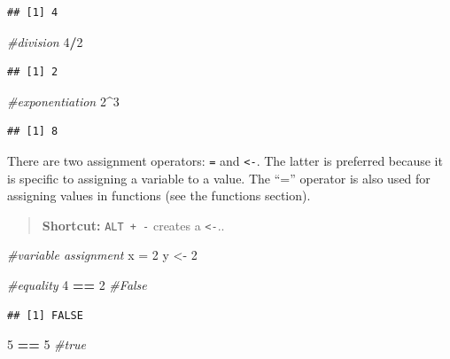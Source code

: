 \documentclass[openany]{book}
\newenvironment{Shaded}{\begin{snugshade}}{\end{snugshade}}
\newcommand{\CommentTok}[1]{\textcolor[rgb]{0.56,0.35,0.01}{\textit{#1}}}
\newcommand{\DecValTok}[1]{\textcolor[rgb]{0.00,0.00,0.81}{#1}}
\newcommand{\NormalTok}[1]{#1}
\newcommand{\OperatorTok}[1]{\textcolor[rgb]{0.81,0.36,0.00}{\textbf{#1}}}
\newcommand{\StringTok}[1]{\textcolor[rgb]{0.31,0.60,0.02}{#1}}
\begin{document}
\begin{verbatim}
## [1] 4
\end{verbatim}

\begin{Shaded}
\begin{Highlighting}[]
\CommentTok{#division}
\DecValTok{4}\OperatorTok{/}\DecValTok{2}
\end{Highlighting}
\end{Shaded}

\begin{verbatim}
## [1] 2
\end{verbatim}

\begin{Shaded}
\begin{Highlighting}[]
\CommentTok{#exponentiation}
\DecValTok{2}\OperatorTok{^}\DecValTok{3}
\end{Highlighting}
\end{Shaded}

\begin{verbatim}
## [1] 8
\end{verbatim}

There are two assignment operators: \texttt{=} and \texttt{\textless{}-}. The latter is preferred because it is specific to assigning a variable to a value. The ``='' operator is also used for assigning values in functions (see the functions section).

\begin{quote}
\textbf{Shortcut:} \texttt{ALT\ +\ -} creates a \texttt{\textless{}-}..
\end{quote}

\begin{Shaded}
\begin{Highlighting}[]
\CommentTok{#variable assignment}
\NormalTok{x =}\StringTok{ }\DecValTok{2}
\NormalTok{y <-}\StringTok{ }\DecValTok{2}

\CommentTok{#equality}
\DecValTok{4} \OperatorTok{==}\StringTok{ }\DecValTok{2} \CommentTok{#False}
\end{Highlighting}
\end{Shaded}

\begin{verbatim}
## [1] FALSE
\end{verbatim}

\begin{Shaded}
\begin{Highlighting}[]
\DecValTok{5} \OperatorTok{==}\StringTok{ }\DecValTok{5} \CommentTok{#true}
\end{Highlighting}
\end{Shaded}
\end{document}
